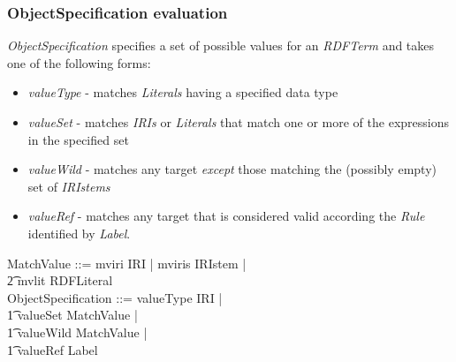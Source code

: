 \documentclass[fuzz]{llncs}
\def\zc{\textit}
\begin{document}
\subsubsection{ObjectSpecification evaluation}
\zc{ObjectSpecification} specifies a set of possible values for an \zc{RDFTerm} and takes one of the following forms:
\begin{itemize}
\item \zc{valueType} - matches \zc{Literals} having a specified data type
\item \zc{valueSet} - matches \zc{IRIs} or \zc{Literals} that match one or more of the expressions in the specified set
\item \zc{valueWild} - matches any target \emph{except} those matching the (possibly empty) set of \zc{IRIstems}
\item \zc{valueRef} - matches any target that is considered valid according the \zc{Rule} identified by \zc{Label}.
\end{itemize}
\begin{zed}
MatchValue ::= mviri \ldata IRI \rdata | mviris \ldata IRIstem \rdata | \\
\t2 mvlit \ldata RDFLiteral \rdata \\
ObjectSpecification ::= valueType \ldata IRI \rdata | \\
\t1 valueSet \ldata \power MatchValue \rdata | \\
\t1 valueWild \ldata \power MatchValue \rdata | \\
\t1 valueRef \ldata Label \rdata
\end{zed}
\end{document}
